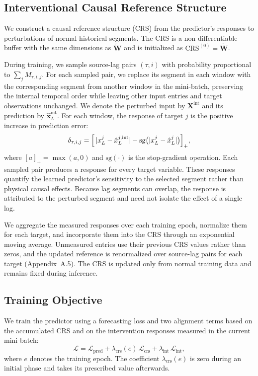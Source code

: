 \documentclass[letterpaper]{article}
\newcommand{\Wt}{\widetilde{\mathbf{W}}}
\newcommand{\CRS}{\mathrm{CRS}}
\begin{document}
\subsection{Interventional Causal Reference Structure}
We construct a causal reference structure (CRS) from the predictor's responses to perturbations of normal historical segments. The CRS is a non-differentiable buffer with the same dimensions as $\Wt$ and is initialized as $\CRS^{(0)}=\Wt$.

During training, we sample source-lag pairs $(\tau,i)$ with probability proportional to $\sum_j M_{\tau,i,j}$. For each sampled pair, we replace its segment in each window with the corresponding segment from another window in the mini-batch, preserving the internal temporal order while leaving other input entries and target observations unchanged. We denote the perturbed input by $\mathbf{X}^{\mathrm{int}}$ and its prediction by $\hat{\mathbf{x}}^{\mathrm{int}}_L$. For each window, the response of target $j$ is the positive increase in prediction error:
\begin{equation}
\delta_{\tau,i,j}=\Bigl[\,|x^j_L-\hat{x}^{j,\mathrm{int}}_L|-\mathrm{sg}\bigl(|x^j_L-\hat{x}^j_L|\bigr)\Bigr]_+ ,
\label{eq:response}
\end{equation}
where $[a]_+=\max(a,0)$ and $\mathrm{sg}(\cdot)$ is the stop-gradient operation. Each sampled pair produces a response for every target variable. These responses quantify the learned predictor's sensitivity to the selected segment rather than physical causal effects. Because lag segments can overlap, the response is attributed to the perturbed segment and need not isolate the effect of a single lag.

We aggregate the measured responses over each training epoch, normalize them for each target, and incorporate them into the CRS through an exponential moving average. Unmeasured entries use their previous CRS values rather than zeros, and the updated reference is renormalized over source-lag pairs for each target (Appendix~A.5). The CRS is updated only from normal training data and remains fixed during inference.

\subsection{Training Objective}
We train the predictor using a forecasting loss and two alignment terms based on the accumulated CRS and on the intervention responses measured in the current mini-batch:
\begin{equation}
\mathcal{L}=\mathcal{L}_{\mathrm{pred}}+\lambda_{\mathrm{crs}}(e)\,\mathcal{L}_{\mathrm{crs}}+\lambda_{\mathrm{int}}\,\mathcal{L}_{\mathrm{int}},
\label{eq:loss}
\end{equation}
where $e$ denotes the training epoch. The coefficient $\lambda_{\mathrm{crs}}(e)$ is zero during an initial phase and takes its prescribed value afterwards.
\end{document}
